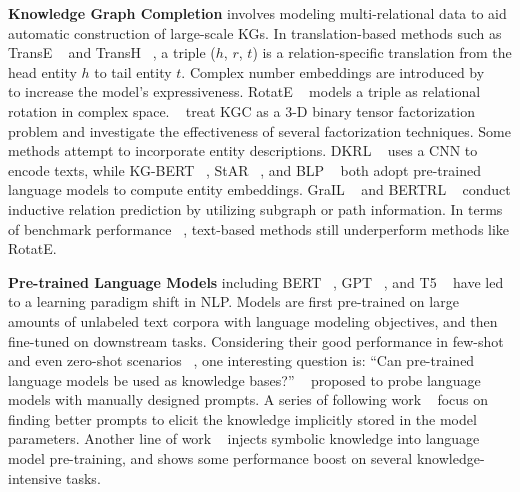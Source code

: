 \documentclass[11pt]{article}
\begin{document}
\noindent
\textbf{Knowledge Graph Completion }
involves modeling multi-relational data
to aid automatic construction of large-scale KGs.
In translation-based methods
such as TransE ~\citep{bordes2013translating} and TransH ~\citep{wang2014knowledge},
a triple ($h$, $r$, $t$) is a relation-specific translation
from the head entity $h$ to tail entity $t$.
Complex number embeddings are introduced by ~\citet{trouillon2016complex}
to increase the model's expressiveness.
RotatE ~\citep{sun2018rotate} models a triple as relational rotation in complex space.
~\citet{nickel2011three,balazevic-etal-2019-tucker} treat KGC as a 3-D binary tensor factorization problem
and investigate the effectiveness of several factorization techniques.
Some methods attempt to incorporate entity descriptions.
DKRL ~\citep{xie2016representation} uses a CNN to encode texts,
while KG-BERT ~\citep{yao2019kg}, StAR ~\citep{wang2021structure}, and BLP ~\citep{daza2021inductive}
both adopt pre-trained language models to compute entity embeddings.
GraIL ~\citep{Teru2020InductiveRP} and BERTRL ~\citep{Zha2021InductiveRP}
conduct inductive relation prediction by utilizing subgraph or path information.
In terms of benchmark performance ~\citep{wang2021kepler},
text-based methods still underperform methods like RotatE.
\newline

\noindent
\textbf{Pre-trained Language Models }
including BERT ~\citep{devlin-etal-2019-bert},
GPT ~\citep{radford2018improving}, and T5 ~\citep{Raffel2020ExploringTL}
have led to a learning paradigm shift in NLP.
Models are first pre-trained on large amounts of unlabeled text corpora
with language modeling objectives,
and then fine-tuned on downstream tasks.
Considering their good performance in few-shot and
even zero-shot scenarios ~\citep{Brown2020LanguageMA},
one interesting question is:
``Can pre-trained language models be
used as knowledge bases?''
~\citet{petroni-etal-2019-language} proposed to probe language models
with manually designed prompts.
A series of following work ~\citep{shin-etal-2020-autoprompt,zhong2021factual,jiang-etal-2020-know}
focus on finding better prompts
to elicit the knowledge implicitly stored in the model parameters.
Another line of work ~\citep{zhang-etal-2019-ernie,liu2020k,wang2021kepler}
injects symbolic knowledge into language model pre-training,
and shows some performance boost on several knowledge-intensive tasks.
\newline
\end{document}
